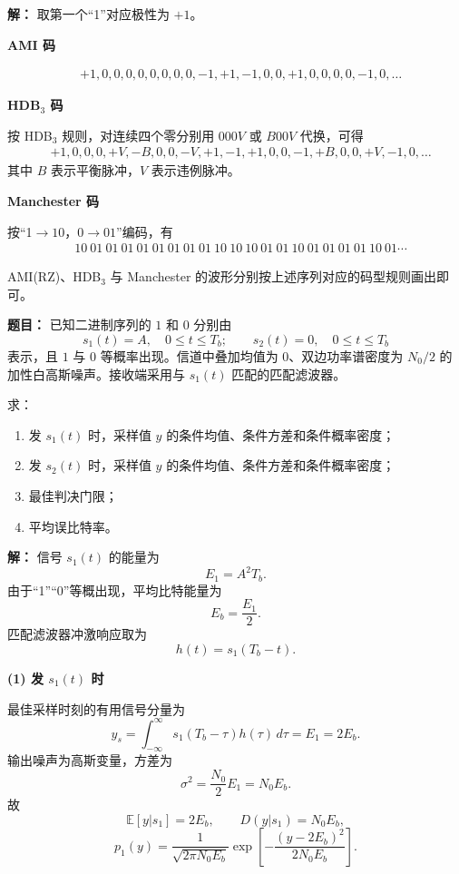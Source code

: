 \par\textbf{解：}
取第一个“1”对应极性为 $+1$。

\textbf{AMI 码}\par
\[
\begin{aligned}
&+1,0,0,0,0,0,0,0,0,-1,+1,-1,0,0,+1,0,0,0,0,-1,0,\dots
\end{aligned}
\]

\textbf{HDB$_3$ 码}\par
按 HDB$_3$ 规则，对连续四个零分别用 $000V$ 或 $B00V$ 代换，可得
\[
\begin{aligned}
&+1,0,0,0,+V,-B,0,0,-V,+1,-1,+1,0,0,-1,+B,0,0,+V,-1,0,\dots
\end{aligned}
\]
其中 $B$ 表示平衡脉冲，$V$ 表示违例脉冲。

\textbf{Manchester 码}\par
按“1$\to 10$，0$\to 01$”编码，有
\[
\begin{aligned}
&10\ 01\ 01\ 01\ 01\ 01\ 01\ 01\ 01\ 10\ 10\ 10\ 01\ 01\ 10\ 01\ 01\ 01\ 01\ 10\ 01\cdots
\end{aligned}
\]

AMI(RZ)、HDB$_3$ 与 Manchester 的波形分别按上述序列对应的码型规则画出即可。

\medskip
{}
\textbf{题目：}
已知二进制序列的 $1$ 和 $0$ 分别由
\[
s_1(t)=A,\quad 0\le t\le T_b;
\qquad
s_2(t)=0,\quad 0\le t\le T_b
\]
表示，且 $1$ 与 $0$ 等概率出现。信道中叠加均值为 $0$、双边功率谱密度为 $N_0/2$ 的加性白高斯噪声。接收端采用与 $s_1(t)$ 匹配的匹配滤波器。

求：
\begin{enumerate}
\item 发 $s_1(t)$ 时，采样值 $y$ 的条件均值、条件方差和条件概率密度；
\item 发 $s_2(t)$ 时，采样值 $y$ 的条件均值、条件方差和条件概率密度；
\item 最佳判决门限；
\item 平均误比特率。
\end{enumerate}

\par\textbf{解：}
信号 $s_1(t)$ 的能量为
\[
E_1=A^2T_b.
\]
由于“1”“0”等概出现，平均比特能量为
\[
E_b=\frac{E_1}{2}.
\]
匹配滤波器冲激响应取为
\[
h(t)=s_1(T_b-t).
\]

\textbf{(1) 发 $s_1(t)$ 时}\par
最佳采样时刻的有用信号分量为
\[
y_s=\int_{-\infty}^{\infty}s_1(T_b-\tau)h(\tau)\,d\tau=E_1=2E_b.
\]
输出噪声为高斯变量，方差为
\[
\sigma^2=\frac{N_0}{2}E_1=N_0E_b.
\]
故
\[
\mathbb{E}[y|s_1]=2E_b,
\qquad
D(y|s_1)=N_0E_b,
\]
\[
p_1(y)=\frac{1}{\sqrt{2\pi N_0E_b}}
\exp\!\left[-\frac{(y-2E_b)^2}{2N_0E_b}\right].
\]


